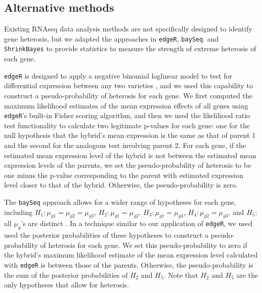 \documentclass[useAMS,usenatbib,referee]{biom}
\begin{document}
\subsection{Alternative methods}
\label{s:alternative}

Existing RNAseq data analysis methods are not specifically designed to identify gene heterosis, but we adapted the approaches in {\tt edgeR}, {\tt baySeq}. and {\tt ShrinkBayes} to provide statistics to measure the strength of extreme heterosis of each gene.

{\tt edgeR} is designed to apply a negative binomial loglinear model to test for differential expression between any two varieties \citep{robinson2007moderated, robinson2010edgeR}, and we used this capability to construct a pseudo-probability of heterosis for each gene. We first computed the maximum likelihood estimates of the mean expression effects of all genes using {\tt edgeR}'s built-in Fisher scoring algorithm, and then we used the likelihood ratio test functionality to calculate two legitimate p-values for each gene: one for the null hypothesis that the hybrid's mean expression is the same as that of parent 1 and the second for the analogous test involving parent 2. For each gene, if the estimated mean expression level of the hybrid is not between the estimated mean expression levels of the parents, we set the pseudo-probability of heterosis to be one minus the p-value corresponding to the parent with estimated expression level closer to that of the hybrid. Otherwise, the pseudo-probability is zero.

The {\tt baySeq} approach allows for a wider range of hypotheses for each gene, including $H_1: \mu_{g1}=\mu_{g2}=\mu_{g3}$, $H_2: \mu_{g1}=\mu_{g2}$, $H_3: \mu_{g1}=\mu_{g3}$, $H_4: \mu_{g2}=\mu_{g3}$, and $H_5:$ all $\mu_g$'s are distinct \citep{hardcastle2010bayseq, hardcastle2012baySeq}. In a technique similar to our application of {\tt edgeR}, we used used the posterior probabilities of these hypotheses to construct a pseudo-probability of heterosis for each gene. We set this pseudo-probability to zero if the hybrid's maximum likelihood estimate of the mean expression level calculated with {\tt edgeR} is between those of the parents. Otherwise, the pseudo-probability is the sum of the posterior probabilities of $H_2$ and $H_5$. Note that $H_2$ and $H_5$ are the only hypotheses that allow for heterosis.
\end{document}
